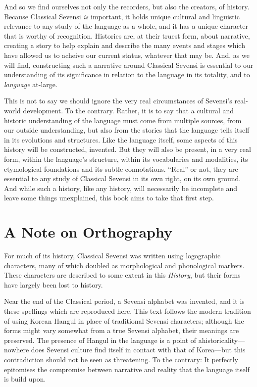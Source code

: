 And so we find ourselves not only the recorders, but also the creators, of history.
Because Classical Sevensi \emph{is} important, it holds unique cultural and linguistic relevance to any study of the language as a whole, and it has a unique character that is worthy of recognition.
Histories are, at their truest form, about narrative, creating a story to help explain and describe the many events and stages which have allowed us to acheive our current status, whatever that may be.
And, as we will find, constructing such a narrative around Classical Sevensi is essential to our understanding of its significance in relation to the language in its totality, and to \emph{language} at-large.

This is not to say we should ignore the very real circumstances of Sevensi's real-world development.
To the contrary.
Rather, it is to say that a cultural and historic understanding of the language must come from multiple sources, from our outside understanding, but also from the stories that the language tells itself in its evolutions and structures.
Like the language itself, some aspects of this history will be constructed, invented.
But they will also be present, in a very real form, within the language's structure, within its vocabularies and modalities, its etymological foundations and its subtle connotations.
“Real” or not, they are essential to any study of Classical Sevensi in its own right, on its own ground.
And while such a history, like any history, will necessarily be incomplete and leave some things unexplained, this book aims to take that first step.

\emptybreak[plain]

\chapter*{A Note on Orthography} \label{orthography}

For much of its history, Classical Sevensi was written using logographic characters, many of which doubled as morphological and phonological markers.
These characters are described to some extent in this \emph{History}, but their forms have largely been lost to history.

Near the end of the Classical period, a Sevensi alphabet was invented, and it is these spellings which are reproduced here.
This text follows the modern tradition of using Korean Hangul in place of traditional Sevensi characters; although the forms might vary somewhat from a true Sevensi alphabet, their meanings are preserved.
The presence of Hangul in the language is a point of ahistoricality—nowhere does Sevensi culture find itself in contact with that of Korea—but this contradiction should not be seen as threatening.
To the contrary: It perfectly epitomises the compromise between narrative and reality that the language itself is build upon.

